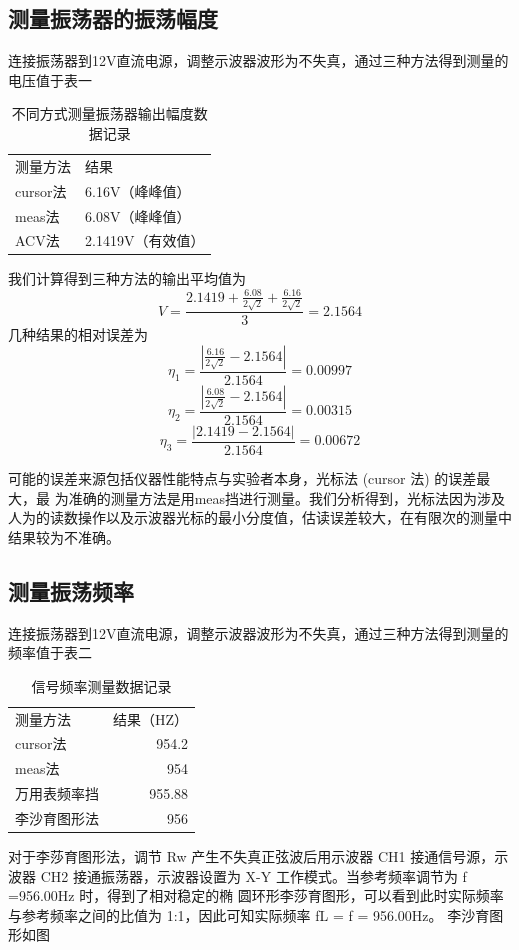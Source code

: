 \documentclass[a4paper,11pt,UTF8]{ctexart}
\begin{document}
\subsection{测量振荡器的振荡幅度}
	连接振荡器到12V直流电源，调整示波器波形为不失真，通过三种方法得到测量的电压值于表一
	\begin{table}[htbp]
		\centering
		\caption{ 不同方式测量振荡器输出幅度数据记录}
		\begin{tabular}{ll}
			测量方法  & 结果 \\
			cursor法 & 6.16V（峰峰值） \\
			meas法 & 6.08V（峰峰值） \\
			ACV法  & 2.1419V（有效值） \\
		\end{tabular}%
		\label{tab:addlabel}%
	\end{table}%

	我们计算得到三种方法的输出平均值为
	\[V = \frac{2.1419+\frac{6.08}{2\sqrt{2}}+\frac{6.16}{2\sqrt{2}}}{3} = 2.1564\]
	几种结果的相对误差为
	\[\eta_1 = \frac{|\frac{6.16}{2\sqrt{2}}-2.1564|}{2.1564} = 0.00997\]
	\[\eta_2 = \frac{|\frac{6.08}{2\sqrt{2}}-2.1564|}{2.1564} = 0.00315\]
	\[\eta_3 = \frac{|2.1419-2.1564|}{2.1564} = 0.00672\]
	
	可能的误差来源包括仪器性能特点与实验者本身，光标法 (cursor 法) 的误差最大，最
	为准确的测量方法是用meas挡进行测量。我们分析得到，光标法因为涉及人为的读数操作以及示波器光标的最小分度值，估读误差较大，在有限次的测量中结果较为不准确。
	

	
	
	

\subsection{测量振荡频率}
	连接振荡器到12V直流电源，调整示波器波形为不失真，通过三种方法得到测量的频率值于表二
	\begin{table}[htbp]
		\centering
		\caption{信号频率测量数据记录}
		\begin{tabular}{lr}
			测量方法  & \multicolumn{1}{l}{结果（HZ）} \\
			cursor法 & 954.2 \\
			meas法 & 954 \\
			万用表频率挡 & 955.88 \\
			李沙育图形法 & 956 \\
		\end{tabular}%
		\label{tab:addlabel}%
	\end{table}%
	对于李莎育图形法，调节 Rw 产生不失真正弦波后用示波器 CH1 接通信号源，示波器 CH2 接通振荡器，示波器设置为 X-Y 工作模式。当参考频率调节为 f =956.00Hz 时，得到了相对稳定的椭
	圆环形李莎育图形，可以看到此时实际频率与参考频率之间的比值为 1:1，因此可知实际频率
	fL = f = 956.00Hz。
	李沙育图形如图
	
\end{document}
